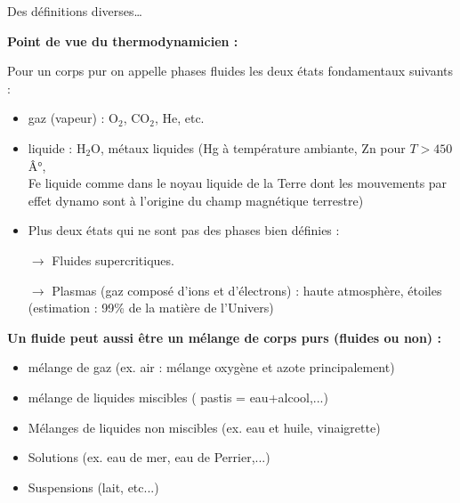\begin{frame}{Des définitions diverses\ldots}

\small

\textbf{Point de vue du thermodynamicien :} \bigskip

Pour un corps pur on appelle phases fluides les deux états fondamentaux suivants : 

\pause

\medskip

\begin{itemize}[<+-| alert@+>]
\item
	gaz (vapeur) : \textrm{O$_2$}, \textrm{CO$_2$}, \textrm{He}, etc.
\item
	liquide : \textrm{H$_2$O}, métaux liquides (\textrm{Hg} à température ambiante, 
	\textrm{Zn} pour $T>450$Â°, \\
	\textrm{Fe} liquide comme dans le noyau liquide de la Terre dont les mouvements par effet dynamo 
	sont à l'origine du champ magnétique terrestre)

\item Plus deux états qui ne sont pas des phases bien définies :
	
$\rightarrow$ 
Fluides supercritiques. 
	
$\rightarrow$
	Plasmas (gaz composé d'ions et d'électrons) : 
	haute atmosphère, étoiles (estimation : 99\% de la matière de l'Univers)

\end{itemize}


\pause



\textbf{
Un fluide peut aussi être un mélange de corps purs (fluides ou non) :}

\pause

\medskip

\begin{itemize}[<+-| alert@+>]
\item
	mélange de gaz (ex. air : mélange oxygène et azote principalement)

\item mélange de liquides miscibles	
	( pastis = eau+alcool,...)

\item Mélanges de liquides non miscibles (ex. eau et huile, vinaigrette)

\item Solutions (ex. eau de mer, eau de Perrier,...)

\item Suspensions (lait, etc...)
	
\end{itemize}


\end{frame}

